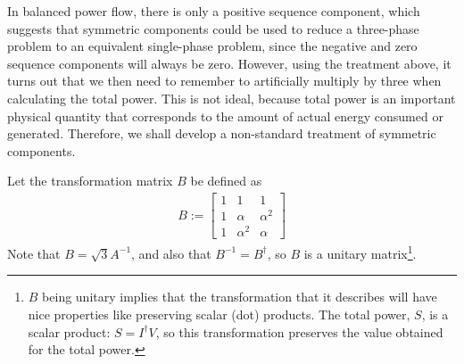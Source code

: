 \documentclass[11pt]{article}
\begin{document}
In balanced power flow, there is only a positive sequence component, which suggests that symmetric components could be used to reduce a three-phase problem to an equivalent single-phase problem, since the negative and zero sequence components will always be zero. However, using the treatment above, it turns out that we then need to remember to artificially multiply by three when calculating the total power. This is not ideal, because total power is an important physical quantity that corresponds to the amount of actual energy consumed or generated. Therefore, we shall develop a non-standard treatment of symmetric components.

Let the transformation matrix $B$ be defined as
\begin{align}
	B := \left[
		\begin{array}{lll}
			1 & 1 & 1 \\
			1 & \alpha & \alpha^2 \\
			1 & \alpha^2 & \alpha
		\end{array}
	\right]
\end{align}
Note that $B = \sqrt{3}A^{-1}$, and also that $B^{-1} = B^\dag$, so $B$ is a unitary matrix\footnote{$B$ being unitary implies that the transformation that it describes will have nice properties like preserving scalar (dot) products. The total power, $S$, is a scalar product: $S = I^\dag V$, so this transformation preserves the value obtained for the total power.}.
\end{document}
